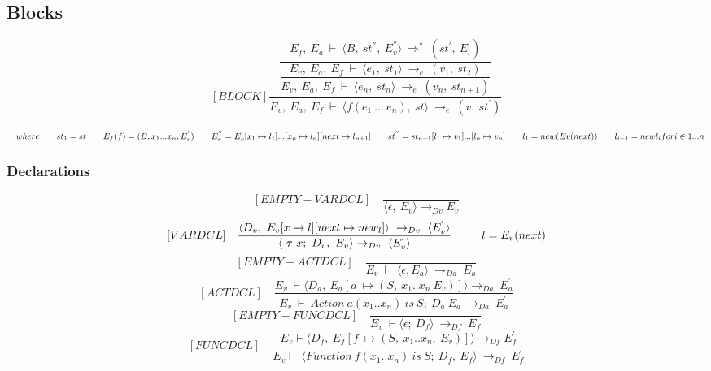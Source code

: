 \subsection{Blocks}
\[	
[BLOCK]	
\dfrac{\dfrac{E_f, \ E_a \ \vdash \ \langle B, \ st^{''}, \ E_v^{''} \rangle \ \Rightarrow^* \ (st^{'}, \ E_l^{'})}{\dfrac{E_v, \ E_a, \ E_f \ \vdash \ \langle e_1, \ st_1 \rangle \ \rightarrow_e \ (v_1, \ st_2)}{E_v, \ E_a, \ E_f \ \vdash \ \langle e_n, \ st_n \rangle \ \rightarrow_e \ (v_n, \ st_{n+1})}}}{E_v, \ E_a, \ E_f \ \vdash \ \langle f(e_1 \ ... \ e_n), \ st \rangle \ \rightarrow_e \ (v, \ st^{'})}	
\]

\begin{math}		
\quad where \newline		
\qquad st_1 = st \newline		
\qquad E_f(f) = (B, x_1 ... x_n, E_v^{'}) \newline		
\qquad E_v^{''} = E_v^{'}[x_1 \mapsto l_1] ... [x_n \mapsto l_n] [next \mapsto l_{n+1}] \newline		
\qquad st^{''} = st_{n+1}[l_1 \mapsto v_1] ... [l_n \mapsto v_n] \newline		
\qquad l_1 = new (Ev(next)) \newline		
\qquad l_{i+1}= new l_i for i \in {1 ... n}		
\end{math}

\subsubsection{Declarations}	
\[	
[EMPTY-VARDCL] \quad	
\dfrac{}{\langle\epsilon, \ E_v\rangle \rightarrow_{Dv} E_v}	
\]\newline
\[	
[VARDCL] \quad	
\dfrac{ \langle D_v, \ E_v[x \mapsto l][next \mapsto new_l]\rangle \ \rightarrow_{Dv} \ \langle E_v^{'} \rangle }{ \langle \ \tau \ x; \ D_v,\ E_v \rangle \rightarrow_{Dv} \ \langle E_v^{'} \rangle } \newline	
\qquad \ \ l = E_v(next)	
\]\newline
\[	
[EMPTY-ACTDCL] \quad	
\dfrac{}{E_v \ \vdash \ \langle \epsilon, E_a \rangle \ \rightarrow_{Da} \ E_a}	
\]\newline
\[	
[ACTDCL] \quad	
\dfrac{E_v \ \vdash \langle D_a, \ E_a[a \ \mapsto (S, \ x_1 .. x_n \ E_v)] \rangle \rightarrow_{Da} \ E_a^{'}}{E_v \ \vdash \ Action \ a(x_1 .. x_n) \ is \ S; \ D_a \ E_a \ \rightarrow_{Da} \ E_a^{'}}	
\]\newline
\[	
[EMPTY-FUNCDCL] \quad	
\dfrac{}{E_v \ \vdash \langle \epsilon; \ D_f \rangle \ \rightarrow_{Df} \ E_f}	
\]\newline
\[	
[FUNCDCL] \quad	
\dfrac{E_v \vdash \langle D_f, \ E_f[f \ \mapsto (S, \ x_1 .. x_n, \ E_v)] \rangle \rightarrow_{Df} E_f^{'}}{E_v \vdash \ \langle Function \ f(x_1 .. x_n) \ is \ S; \ D_f, \ E_f \rangle \ \rightarrow_{Df} \ E_f^{'}}	
\]

